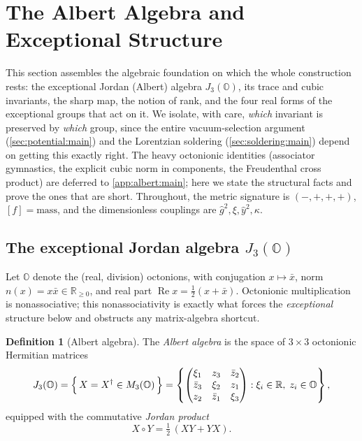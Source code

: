 \documentclass[11pt]{article}
\theoremstyle{plain}
\theoremstyle{definition}
\newtheorem{definition}[theorem]{Definition}
\theoremstyle{remark}
\begin{document}
\section{The Albert Algebra and Exceptional Structure}
\label{sec:albert:main}

This section assembles the algebraic foundation on which the whole
construction rests: the exceptional Jordan (Albert) algebra
$J_{3}(\mathbb{O})$, its trace and cubic invariants, the sharp map, the
notion of rank, and the four real forms of the exceptional groups that
act on it. We isolate, with care, \emph{which} invariant is preserved by
\emph{which} group, since the entire vacuum-selection argument
(\autoref{sec:potential:main}) and the Lorentzian soldering
(\autoref{sec:soldering:main}) depend on getting this exactly right. The
heavy octonionic identities (associator gymnastics, the explicit cubic
norm in components, the Freudenthal cross product) are deferred to
\autoref{app:albert:main}; here we state the structural facts and prove
the ones that are short. Throughout, the metric signature is
$(-,+,+,+)$, $[f]=\mathrm{mass}$, and the dimensionless couplings are
$\hat g^{2},\xi,\hat y^{2},\kappa$.

\subsection{The exceptional Jordan algebra \texorpdfstring{$J_{3}(\mathbb{O})$}{J3(O)}}
\label{sec:albert:def}

Let $\mathbb{O}$ denote the (real, division) octonions, with conjugation
$x\mapsto \bar x$, norm $n(x)=x\bar x\in\mathbb{R}_{\ge 0}$, and real part
$\operatorname{Re} x=\tfrac12(x+\bar x)$. Octonionic multiplication is
nonassociative; this nonassociativity is exactly what forces the
\emph{exceptional} structure below and obstructs any matrix-algebra
shortcut.

\begin{definition}[Albert algebra]\label{def:albert:J3O}
The \emph{Albert algebra} is the space of $3\times 3$ octonionic
Hermitian matrices
\begin{equation}\label{eq:albert:J3Odef}
  J_{3}(\mathbb{O})
  =\Bigl\{\,X=X^{\dagger}\in M_{3}(\mathbb{O})\,\Bigr\}
  =\left\{
  \begin{pmatrix}
   \xi_{1} & z_{3} & \bar z_{2}\\
   \bar z_{3} & \xi_{2} & z_{1}\\
   z_{2} & \bar z_{1} & \xi_{3}
  \end{pmatrix}
  : \xi_{i}\in\mathbb{R},\; z_{i}\in\mathbb{O}\right\},
\end{equation}
equipped with the commutative \emph{Jordan product}
\begin{equation}\label{eq:albert:jordanprod}
  X\circ Y=\tfrac12\,(XY+YX).
\end{equation}
\end{definition}
\end{document}
